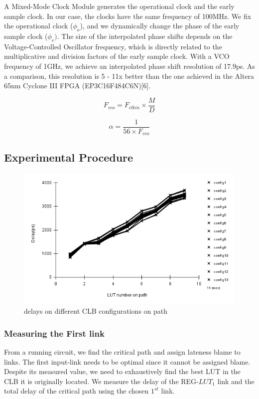 \documentclass[11pt]{report}
\begin{document}
\begin{mainf}
A Mixed-Mode Clock Module generates the operational clock and the early sample clock. In our case, the clocks have the same frequency of 100MHz. We fix the operational clock ($\phi_o$), and we dynamically change the phase of the early sample clock ($\phi_e)$. The size of the interpolated phase shifts depends on the Voltage-Controlled Oscillator frequency, which is directly related to the multiplicative and division factors of the early sample clock. With a VCO frequency of 1GHz, we achieve an interpolated phase shift resolution of 17.9ps. As a comparison, this resolution is 5 - 11x better than the one achieved in the Altera 65nm Cyclone III FPGA (EP3C16F484C6N)[6]. 

$$F_{vco} = F_{clkin} \times \frac{M}{D}$$

$$\alpha = \frac{1}{56 \times F_{vco}}$$

\subsection{\textbf{Experimental Procedure}}

\begin{figure}[H]
    \centering
    \includegraphics[width=0.5\linewidth]{path_optimization.png}
    \caption{delays on different CLB  configurations on path}
    \label{fig:enter-label}
\end{figure}
\subsubsection{Measuring the First link}

From a running circuit, we find the critical path and assign lateness blame to links. The first input-link needs to be optimal since it cannot be assigned blame. Despite its measured value, we need to exhaustively find the best LUT in the CLB it is originally located. We measure the delay of the REG-$LUT_1$ link and the total delay of the critical path using the chosen $1^{st}$ link. 


\end{mainf}
\end{document}
